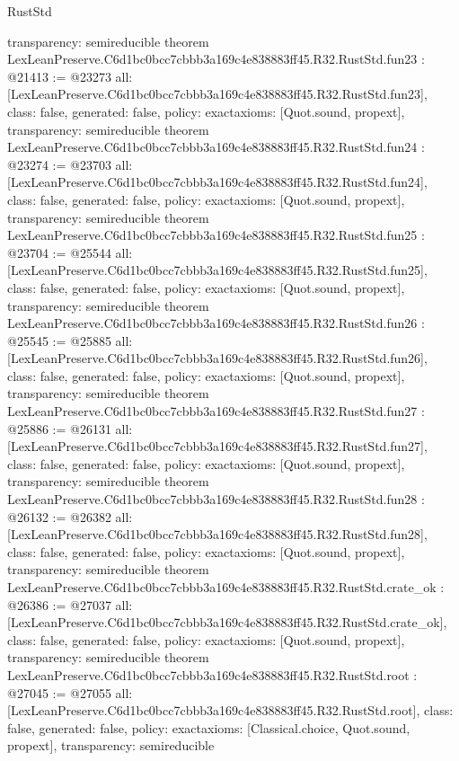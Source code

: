 \begin{lexlean}{RustStd}
\begin{coremodule}
{  transparency: semireducible
}
theorem LexLeanPreserve.C6d1bc0bcc7cbbb3a169c4e838883ff45.R32.RustStd.fun23 : @21413 := @23273 {
  all: [LexLeanPreserve.C6d1bc0bcc7cbbb3a169c4e838883ff45.R32.RustStd.fun23],
  class: false,
  generated: false,
  policy: exact{axioms: [Quot.sound, propext]},
  transparency: semireducible
}
theorem LexLeanPreserve.C6d1bc0bcc7cbbb3a169c4e838883ff45.R32.RustStd.fun24 : @23274 := @23703 {
  all: [LexLeanPreserve.C6d1bc0bcc7cbbb3a169c4e838883ff45.R32.RustStd.fun24],
  class: false,
  generated: false,
  policy: exact{axioms: [Quot.sound, propext]},
  transparency: semireducible
}
theorem LexLeanPreserve.C6d1bc0bcc7cbbb3a169c4e838883ff45.R32.RustStd.fun25 : @23704 := @25544 {
  all: [LexLeanPreserve.C6d1bc0bcc7cbbb3a169c4e838883ff45.R32.RustStd.fun25],
  class: false,
  generated: false,
  policy: exact{axioms: [Quot.sound, propext]},
  transparency: semireducible
}
theorem LexLeanPreserve.C6d1bc0bcc7cbbb3a169c4e838883ff45.R32.RustStd.fun26 : @25545 := @25885 {
  all: [LexLeanPreserve.C6d1bc0bcc7cbbb3a169c4e838883ff45.R32.RustStd.fun26],
  class: false,
  generated: false,
  policy: exact{axioms: [Quot.sound, propext]},
  transparency: semireducible
}
theorem LexLeanPreserve.C6d1bc0bcc7cbbb3a169c4e838883ff45.R32.RustStd.fun27 : @25886 := @26131 {
  all: [LexLeanPreserve.C6d1bc0bcc7cbbb3a169c4e838883ff45.R32.RustStd.fun27],
  class: false,
  generated: false,
  policy: exact{axioms: [Quot.sound, propext]},
  transparency: semireducible
}
theorem LexLeanPreserve.C6d1bc0bcc7cbbb3a169c4e838883ff45.R32.RustStd.fun28 : @26132 := @26382 {
  all: [LexLeanPreserve.C6d1bc0bcc7cbbb3a169c4e838883ff45.R32.RustStd.fun28],
  class: false,
  generated: false,
  policy: exact{axioms: [Quot.sound, propext]},
  transparency: semireducible
}
theorem LexLeanPreserve.C6d1bc0bcc7cbbb3a169c4e838883ff45.R32.RustStd.crate_ok : @26386 := @27037 {
  all: [LexLeanPreserve.C6d1bc0bcc7cbbb3a169c4e838883ff45.R32.RustStd.crate_ok],
  class: false,
  generated: false,
  policy: exact{axioms: [Quot.sound, propext]},
  transparency: semireducible
}
theorem LexLeanPreserve.C6d1bc0bcc7cbbb3a169c4e838883ff45.R32.RustStd.root : @27045 := @27055 {
  all: [LexLeanPreserve.C6d1bc0bcc7cbbb3a169c4e838883ff45.R32.RustStd.root],
  class: false,
  generated: false,
  policy: exact{axioms: [Classical.choice, Quot.sound, propext]},
  transparency: semireducible
}


\end{coremodule}
\end{lexlean}
